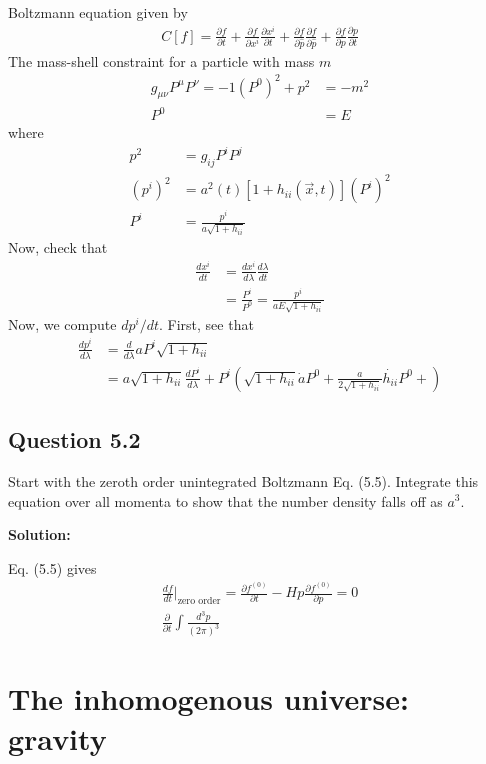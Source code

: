 \documentclass[11pt]{article}
\begin{document}
Boltzmann equation given by 
\begin{align*}
    C[f] = \frac{\partial f}{\partial t} + \frac{\partial f}{\partial x^i} \frac{\partial x^i}{\partial t}  + \frac{\partial f}{\partial \hat{p}} \frac{\partial f}{\partial \hat{p}} + \frac{\partial f}{\partial p} \frac{\partial p }{\partial t}
\end{align*}
The mass-shell constraint for a particle with mass $m$ 
\begin{align*}
    g_{\mu\nu}P^\mu P^\nu = -1 (P^0)^2 + p^2 &= -m^2 \\
    P^0 &= E
\end{align*}
where 
\begin{align*}
    p^2 &= g_{ij} P^i P^j \\
    (p^i)^2 &= a^2 (t) [1 + h_{ii}(\vec{x}, t)](P^i)^2 \\
    P^i &= \frac{p^i}{a\sqrt{1 + h_{ii}}}
\end{align*}
Now, check that 
\begin{align*}
    \frac{dx^i}{dt } &= \frac{dx^i }{d\lambda} \frac{d\lambda}{dt } \\
    &= \frac{P^i}{P^0} = \frac{p^i}{aE \sqrt{1 + h_{ii}}}
\end{align*}
Now, we compute $dp^i/dt$. First, see that 
\begin{align*}
    \frac{dp^i}{d\lambda} &= \frac{d}{d\lambda} aP^i \sqrt{1+h_{ii}} \\
    &= a \sqrt{1+h_{ii}} \frac{dP^i}{d\lambda} + P^i (\sqrt{1+h_{ii}} \dot{a} P^0 + \frac{a}{2\sqrt{1+h_{ii}}} \dot{h_{ii}} P^0 + )
\end{align*}

\subsection{Question 5.2}
Start with the zeroth order unintegrated Boltzmann Eq. (5.5). Integrate this equation over all momenta to show that the number density falls off as $a^3$. 

\textbf{Solution:}

Eq. (5.5) gives
\begin{align*}
    \frac{df }{dt } \Big|_\text{zero order} = \frac{\partial f^{(0)}}{\partial t} - Hp \frac{\partial f^{(0)}}{\partial p} = 0 \\
    \frac{\partial }{\partial t} \int \frac{d^3p }{(2\pi)^3} 
\end{align*}

\section{The inhomogenous universe: gravity}
\end{document}

